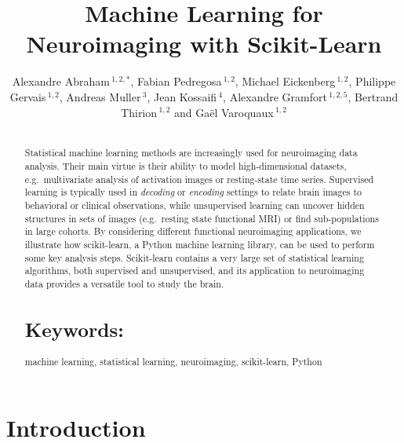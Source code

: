 \documentclass{frontiersSCNS} %
\def\firstAuthorLast{Alexandre Abraham {et~al}} %
\def\Authors{
    Alexandre Abraham\,$^{1,2,*}$,
    Fabian Pedregosa\,$^{1,2}$,
    Michael Eickenberg\,$^{1,2}$,
    Philippe Gervais\,$^{1,2}$,
    Andreas Muller\,$^{3}$,
    Jean Kossaifi\,$^{4}$,
    Alexandre Gramfort\,$^{1,2,5}$,
    Bertrand Thirion\,$^{1,2}$
    and Ga\"el Varoquaux\,$^{1,2}$}
\begin{document}
\onecolumn
{}

\title[Machine Learning for Neuroimaging with Scikit-Learn]{Machine Learning for Neuroimaging with Scikit-Learn}
\author[\firstAuthorLast ]{\Authors}
\address{}
\correspondance{}
\editor{}

\maketitle
\begin{abstract}

\section{}
Statistical machine learning methods are increasingly used for
neuroimaging data analysis. Their main virtue 
is their ability to model high-dimensional datasets, e.g.\ multivariate
analysis of activation images or resting-state time series.
Supervised learning is typically used in \emph{decoding} or
\emph{encoding} settings to relate
brain images to behavioral or clinical observations, while
unsupervised learning can uncover hidden structures in
sets of images (e.g.\ resting state functional MRI) or find
sub-populations in large cohorts. By considering
different functional neuroimaging applications, we illustrate how scikit-learn,
a Python machine learning library, can be used to perform some key
analysis steps. Scikit-learn contains a very large set of statistical
learning algorithms, both supervised and unsupervised, and its
application to neuroimaging data provides a versatile tool to study the
brain.


\tiny
\section{Keywords:} machine learning, statistical learning, neuroimaging,
scikit-learn, Python
\end{abstract}


\section{Introduction}
\end{document}
